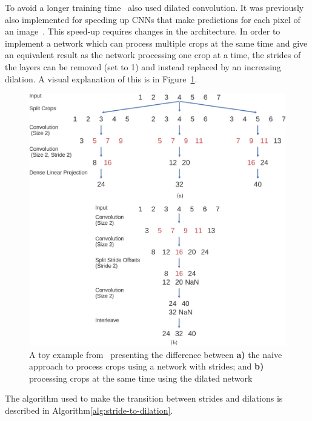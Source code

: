 To avoid a longer training time~\cite{schirrmeister-deep-2017} also used dilated convolution.
It was previously also implemented for speeding up CNNs that make predictions for each pixel of an image~\cite{dense-prediction-images}.
This speed-up requires changes in the architecture.
In order to implement a network which can process multiple crops at the same time and give an equivalent result as the network processing one crop at a time, the strides of the layers can be removed (set to 1) and instead replaced by an increasing dilation.
A visual explanation of this is in Figure~\ref{fig:cropped-decoding-scheme}.

\begin{figure}[!htbp]
\centering
\includegraphics[width=\linewidth]{img/ch3/cropped-decoding-scheme}
\caption[Processing crops]{A toy example from~\cite{schirrmeister-deep-2017} presenting the difference between \textbf{a)} the naive approach to process crops using a network with strides; and \textbf{b)} processing crops at the same time using the dilated network}
\label{fig:cropped-decoding-scheme}
\end{figure}

The algorithm used to make the transition between strides and dilations is described in Algorithm\ref{alg:stride-to-dilation}.

